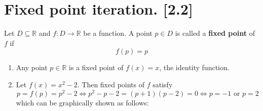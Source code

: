 \documentclass[main.tex]{subfiles}
\begin{document}
\pagestyle{plain}
\setcounter{chapter}{3}

\chapter{Fixed point iteration. [2.2]}
\label{chap:lecture3}
\begin{definition}
    Let $D \subseteq \mathbb{R}$ and $f: D \rightarrow \mathbb{R}$ be a function. A point $p\in D$ is called a \textbf{fixed point} of $f$ if 
    \begin{equation}
        f(p) = p
    \end{equation}
\end{definition}

\begin{example}\par 
    \begin{enumerate}
        \item Any point $p\in \mathbb{R}$ is a fixed point of $f(x) = x$, the identity function. 
        \item Let $f(x) = x^2 - 2$. Then fixed points of $f$ satisfy 
        \begin{equation}
            p = f(p) = p^2 - 2 \Longleftrightarrow p^2 - p - 2 = (p + 1)(p - 2) = 0 \Longleftrightarrow p = -1 \text{ or } p = 2
        \end{equation}
        which can be graphically shown as follows:
        \begin{center}
        \end{center}
    \end{enumerate}
\end{example}
\end{document}
